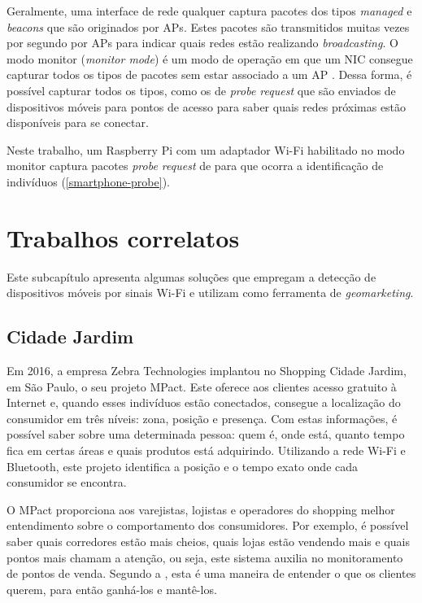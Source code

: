 Geralmente, uma interface de rede qualquer captura pacotes dos tipos \emph{managed} e \emph{beacons} que são originados por APs. Estes pacotes são transmitidos
muitas vezes por segundo por APs para indicar quais redes estão realizando \emph{broadcasting}. O modo monitor (\emph{monitor mode}) é um modo de operação em que um NIC consegue capturar todos os tipos de pacotes sem estar associado a um AP \cite{Acrylic} \cite{Wireshark2017b}. Dessa forma, é possível capturar todos os tipos, como os de \emph{probe request} que são enviados de dispositivos móveis para pontos de acesso para saber quais redes próximas estão disponíveis para se conectar.

Neste trabalho, um Raspberry Pi com um adaptador Wi-Fi habilitado no modo monitor captura pacotes \emph{probe request} de 
para que ocorra a identificação de indivíduos (\autoref{smartphone-probe}).

\section{Trabalhos correlatos}
\label{trabalhos-correlatos}
Este subcapítulo apresenta algumas soluções que
empregam a detecção de dispositivos móveis por sinais Wi-Fi e utilizam como ferramenta
de \emph{geomarketing}.

\subsection{Cidade Jardim}

Em 2016, a empresa Zebra Technologies implantou no Shopping Cidade Jardim, em São Paulo, o seu
projeto MPact. Este oferece aos clientes acesso gratuito à Internet e, quando esses indivíduos estão
conectados, consegue a localização do consumidor em três níveis: zona, posição e
presença. Com estas informações, é possível saber sobre uma determinada pessoa:
quem é, onde está, quanto tempo fica em certas áreas e quais produtos está
adquirindo. Utilizando a rede Wi-Fi e Bluetooth, este projeto identifica a
posição e o tempo exato onde cada consumidor se encontra.

O MPact proporciona aos varejistas, lojistas e operadores do shopping melhor
entendimento sobre o comportamento dos consumidores. Por exemplo, é possível
saber quais corredores estão mais cheios, quais lojas estão vendendo mais e
quais pontos mais chamam a atenção, ou seja, este sistema auxilia no
monitoramento de pontos de venda. Segundo a , esta é uma
maneira de entender o que os clientes querem, para então ganhá-los e mantê-los.

